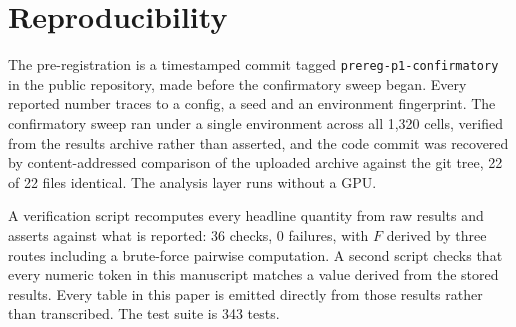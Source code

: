 \documentclass[11pt]{article}
\begin{document}
\section{Reproducibility}

The pre-registration is a timestamped commit tagged \texttt{prereg-p1-confirmatory}
in the public repository, made before the confirmatory sweep began. Every reported
number traces to a config, a seed and an environment fingerprint.
The confirmatory sweep ran under a single environment across all 1{,}320 cells,
verified from the results archive rather than asserted, and the code commit was
recovered by content-addressed comparison of the uploaded archive against the git
tree, 22 of 22 files identical. The analysis layer runs without a GPU.

A verification script recomputes every headline quantity from raw results and
asserts against what is reported: 36 checks, 0 failures, with $F$ derived by three
routes including a brute-force pairwise computation. A second script checks that
every numeric token in this manuscript matches a value derived from the stored
results. Every table in this paper is emitted directly from those results rather
than transcribed. The test suite is 343 tests.

\FloatBarrier
\end{document}
